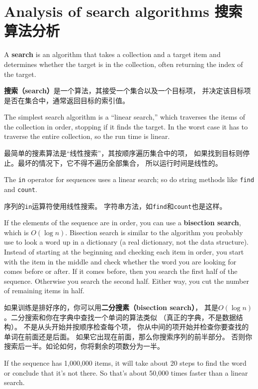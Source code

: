 \documentclass[10pt]{book}
\begin{document}
\begin{CJK}{UTF8}{gbsn}
\begin{exercise}
\end{exercise}


\section{Analysis of search algorithms 搜索算法分析}

A {\bf search} is an algorithm that takes a collection and a target
item and determines whether the target is in the collection, often
returning the index of the target.

{\bf 搜索（search）}是一个算法，其接受一个集合以及一个目标项，
并决定该目标项是否在集合中，通常返回目标的索引值。

The simplest search algorithm is a ``linear search,'' which traverses
the items of the collection in order, stopping if it finds the target.
In the worst case it has to traverse the entire collection, so the run
time is linear.

最简单的搜素算法是``线性搜索''，其按顺序遍历集合中的项，
如果找到目标则停止。最坏的情况下，它不得不遍历全部集合，
所以运行时间是线性的。

The {\tt in} operator for sequences uses a linear search; so do string
methods like {\tt find} and {\tt count}.

序列的{\tt in}运算符使用线性搜索。
字符串方法，如{\tt find}和{\tt count}也是这样。

If the elements of the sequence are in order, you can use a {\bf
  bisection search}, which is $O(\log n)$.  Bisection search is
similar to the algorithm you probably use to look a word up in a
dictionary (a real dictionary, not the data structure).  Instead of starting at
the beginning and checking each item in order, you start with the item
in the middle and check whether the word you are looking for comes
before or after.  If it comes before, then you search the first half
of the sequence.  Otherwise you search the second half.  Either way,
you cut the number of remaining items in half.  

如果训练是排好序的，你可以用{\bf 二分搜素（bisection search）}，
其是$O(\log n)$。二分搜索和你在字典中查找一个单词的算法类似
（真正的字典，不是数据结构）。
不是从头开始并按顺序检查每个项，
你从中间的项开始并检查你要查找的单词在前面还是后面。
如果它出现在前面，那么你搜索序列的前半部分。
否则你搜索后一半。如论如何，你将剩余的项数分为一半。

If the sequence has 1,000,000 items, it will take about 20 steps to
find the word or conclude that it's not there.  So that's about 50,000
times faster than a linear search.


\end{CJK}
\end{document}
